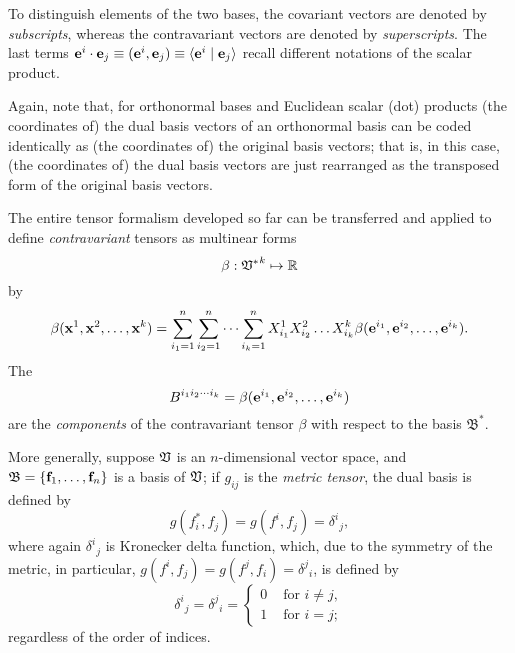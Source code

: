 To distinguish elements of the two bases, the covariant vectors are denoted by {\em subscripts},
whereas the contravariant vectors are denoted by {\em superscripts}.
The last terms $ {\bf e}^i\cdot{\bf e}_j\equiv ({\bf e}^i,{\bf e}_j)\equiv \langle {\bf e}^i\mid {\bf e}_j\rangle  $
recall different notations of the scalar product.

Again, note that, for orthonormal bases and Euclidean scalar (dot) products (the coordinates of) the dual basis vectors of an orthonormal basis can be coded identically
as  (the coordinates of) the original basis vectors; that is,
in this case,
(the coordinates of) the dual basis vectors are just rearranged as the transposed form of the original basis vectors.


The entire tensor formalism developed so far can be transferred and applied to define {\em contravariant} tensors
as multinear forms
\begin{equation}
\beta:{ \frak V^\ast }^k \mapsto {\Bbb R}
\end{equation}
by
\begin{equation}
\beta ( {\bf x}^1,{\bf x}^2,\ldots ,{\bf x}^k)=
\sum_{i_1=1}^n
\sum_{i_2=1}^n
\cdots
\sum_{i_k=1}^n
X_{i_1}^1 X_{i_2}^2 \ldots X_{i_k}^k
\beta ( {\bf e}^{i_1},{\bf e}^{i_2},\ldots ,{\bf e}^{i_k}).
\end{equation}
The
\begin{equation}
B^{{i_1}{i_2}\cdots {i_k}}=\beta ( {\bf e}^{i_1},{\bf e}^{i_2},\ldots ,{\bf e}^{i_k})
\label{2011-m-tvtcontrav}
\end{equation}
 are the
{\em components} of the contravariant tensor $\beta $ with respect to the basis
${\mathfrak B}^\ast$.


More generally,
suppose ${\frak V}$ is an $n$-dimensional vector space, and
${\frak B} = \{{\bf f}_1,\ldots , {\bf f}_n\}$
is a basis of  ${\frak V}$;
if $g_{ij}$ is the {\em metric tensor},
the dual basis is defined by
\begin{equation}
g(f_i^*, f_j)=g( f^i,f_j)={\delta^i}_{j},
\end{equation}
where again  ${\delta^i}_{j}$    is Kronecker delta function, which,
due to the symmetry of the metric, in particular,  $g( f^i,f_j)=g( f^j,f_i)={\delta^j}_{i}$,
is defined by
\begin{equation}
{\delta^i}_{j} = {\delta^j}_{i} =\begin{cases}
0  &\text{ for }i\neq j , \\
1  &\text{ for }i = j;
\end{cases}
\end{equation}
regardless of the order of indices.

